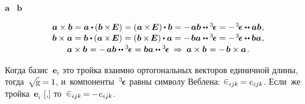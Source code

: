 \begin{otherlanguage}{russian}
\vspace{-0.1em}  $\bm{a}$ ~$\bm{b}$

\nopagebreak\vspace{-0.1em}\begin{equation}\label{crossproductoftwovectors}
\begin{array}{c}
\bm{a} \times \bm{b} = \bm{a} \dotp \hspace{-0.1ex} \left( \bm{b} \hspace{-0.1ex} \times \hspace{-0.25ex} \bm{E} \right) = \left( \bm{a} \hspace{-0.1ex} \times \hspace{-0.25ex} \bm{E} \right) \hspace{-0.1ex} \dotp \bm{b} = - \hspace{.25ex} \bm{a} \bm{b} \dotdotp \levicivitatensor = - \hspace{.2ex} \levicivitatensor \dotdotp \bm{a} \bm{b} \hspace{.1ex},
\\[.1em]
%
\bm{b} \times \bm{a} = \bm{b} \dotp \hspace{-0.1ex} \left( \bm{a} \hspace{-0.1ex} \times \hspace{-0.25ex} \bm{E} \right) = \left( \bm{b} \hspace{-0.1ex} \times \hspace{-0.25ex} \bm{E} \right)  \hspace{-0.1ex} \dotp \bm{a} = - \hspace{.25ex} \bm{b} \bm{a} \dotdotp \levicivitatensor = - \hspace{.2ex} \levicivitatensor \dotdotp \bm{b} \bm{a} \hspace{.1ex},
\\[.15em]
%
\bm{a} \times \bm{b} \hspace{.16ex} = - \hspace{.25ex} \bm{a} \bm{b} \dotdotp \levicivitatensor = \bm{b} \bm{a} \dotdotp \levicivitatensor
\:\Rightarrow\:
\bm{a} \times \bm{b} \hspace{.16ex} = - \hspace{.25ex} \bm{b} \times \bm{a} \hspace{.2ex}.
\end{array}
\end{equation}

Когда базис~${\bm{e}_i}$ это  тройка взаимно ортогональных векторов единичной длины, тогда~${\sqrt{\hspace{-0.36ex}\mathstrut{\textsl{g}}} = \hspace{-0.1ex} 1}$, и~компоненты~${^3\hspace{-0.25ex}\bm{\epsilon}}\hspace{.05ex}$ равны символу Веблена: ${\levicivita_{ijk} \hspace{-0.2ex} = e_{ijk}}$. Если~же тройка~${\bm{e}_i}$ [,] то~${\levicivita_{ijk} \hspace{-0.2ex} = \hspace{-0.1ex} - \hspace{0.1ex} e_{ijk}}$.


\end{otherlanguage}
